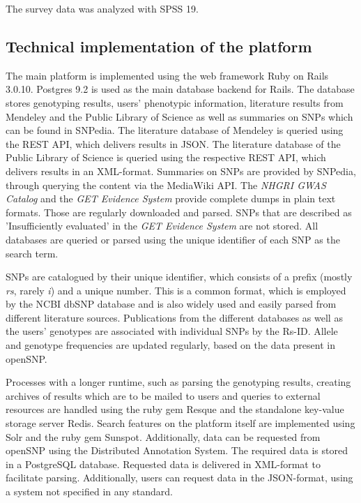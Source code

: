 \documentclass[10pt]{article}
\begin{document}
The survey data was analyzed with SPSS 19. 

\subsection*{Technical implementation of the platform}
The main platform is implemented using the web framework Ruby on Rails 3.0.10. Postgres 9.2 is used as the main database backend for Rails. 
The database stores genotyping results, users' phenotypic information, literature results from Mendeley and the Public Library of Science as well as summaries on SNPs 
which can be found in SNPedia. The literature database of Mendeley is queried using the REST API, which delivers results in JSON. The literature database of 
the Public Library of Science is queried using the respective REST API, which delivers results in an XML-format. Summaries on SNPs are provided by SNPedia, 
through querying the content via the MediaWiki API. The \emph{NHGRI GWAS Catalog} and the \emph{GET Evidence System} provide complete dumps in plain text formats. Those are regularly downloaded and parsed. SNPs that are described as 'Insufficiently evaluated' in the \emph{GET Evidence System} are not stored. All databases are queried or parsed using the unique identifier of each SNP as the search term. 

SNPs are catalogued by their unique identifier, which consists of a prefix (mostly \textit{rs}, rarely \textit{i}) and a unique number. This is a common format, 
which is employed by the NCBI dbSNP database \cite{Sherry2001} and is also widely used and easily parsed from different literature sources. Publications from the different databases as 
well as the users' genotypes are associated with individual SNPs by the Rs-ID. Allele and genotype frequencies are updated regularly, based on the data present in openSNP. 

Processes with a longer runtime, such as parsing the genotyping results, creating archives of results which are to be mailed to users and queries to external resources 
are handled using the ruby gem Resque and the standalone key-value storage server Redis. Search features on the platform itself are implemented using Solr and the ruby gem Sunspot. 
Additionally, data can be requested from openSNP using the Distributed Annotation System. The required data is stored in a PostgreSQL database.  
Requested data is delivered in XML-format to facilitate parsing. Additionally, users can request data in the JSON-format, using a system not specified in any standard.
\end{document}
